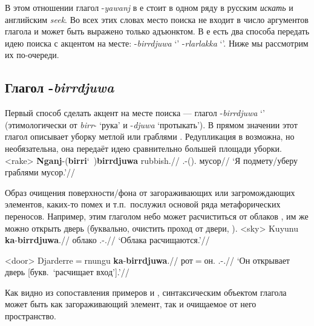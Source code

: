 В этом отношении глагол -\textit{yawanj} в  е стоит в одном ряду в русским \textit{искать} и английским \textit{seek}. Во всех этих словах место поиска не входит в число аргументов глагола и может быть выражено только адъюнктом. В  е есть два способа передать идею поиска с акцентом на месте: -\textit{birrdjuwa} `\bdj' -\textit{rlarlakka} `\rlk'. Ниже мы рассмотрим их по-очереди.

\subsection{Глагол -\textit{birrdjuwa}}
\label{sec:bdj}
Первый способ сделать акцент на месте поиска --- глагол -\textit{birrdjuwa} `\bdj' (этимологически от \textit{birr}- `рука' и -\textit{djuwa} `протыкать'). В прямом значении этот глагол описывает уборку метлой или граблями . Редупликация в  возможна, но необязательна, она передаёт идею сравнительно большей площади уборки.
\ex<rake>\begingl
\gla \textbf{Nganj}-(\textbf{birri}\char`~)\textbf{birrdjuwa} rubbish.//
\glb \Fsg.\Fut-(\rdp)\bdj.\Np{} мусор//
\glft `Я подмету/уберу граблями мусор.'//%
\endgl\xe

Образ очищения поверхности/фона от загораживающих или загромождающих элементов, каких-то помех и т.п.\ послужил основой ряда метафорических переносов. Например, этим глаголом небо может расчиститься от облаков , им же можно открыть дверь (буквально, очистить проход от двери, ).
\ex<sky>\begingl
\gla Kuyunu \textbf{ka}-\textbf{birrdjuwa}.//
\glb облако \Tsg.\Real-\bdj.\Np{}//
\glft `Облака расчищаются.'//
\endgl\xe

\ex<door>\begingl
\gla Djarderre$=$rnungu \textbf{ka}-\textbf{birrdjuwa}.//
\glb рот$=$он.\Gen{} \Tsg.\Real-\bdj.\Np{}//
\glft `Он открывает дверь [букв.\ `расчищает вход'].'//
\endgl\xe

Как видно из сопоставления примеров  и , синтаксическим объектом глагола может быть как загораживающий элемент, так и очищаемое от него пространство.

